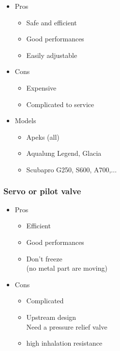 \documentclass[aspectratio=1610,english,12pt]{beamer}
\begin{document}
\begin{frame}{\insertsubsubsection}
	\begin{itemize}
		\item Pros
		\begin{itemize}
			\item Safe and efficient
			\item Good performances
			\item Easily adjustable
		\end{itemize}
		\item Cons
		\begin{itemize}
			\item Expensive
			\item Complicated to service
		\end{itemize}
	\end{itemize}
\end{frame}

\begin{frame}{\insertsubsubsection}
	\begin{itemize}
		\item Models
		\begin{itemize}
			\item Apeks (all)
			\item Aqualung Legend, Glacia
			\item Scubapro G250, S600, A700,...
		\end{itemize}
	\end{itemize}
\end{frame}

\subsubsection{Servo or pilot valve}
\begin{frame}{\insertsubsubsection}
\end{frame}

\begin{frame}{\insertsubsubsection}
	\begin{itemize}
		\item Pros
		\begin{itemize}
			\item Efficient
			\item Good performances
			\item Don't freeze\\ (no metal part are moving)
		\end{itemize}
		\item Cons
		\begin{itemize}
			\item Complicated
			\item Upstream design \\ Need a pressure relief valve
			\item high inhalation resistance
		\end{itemize}
	\end{itemize}
\end{frame}
\end{document}
